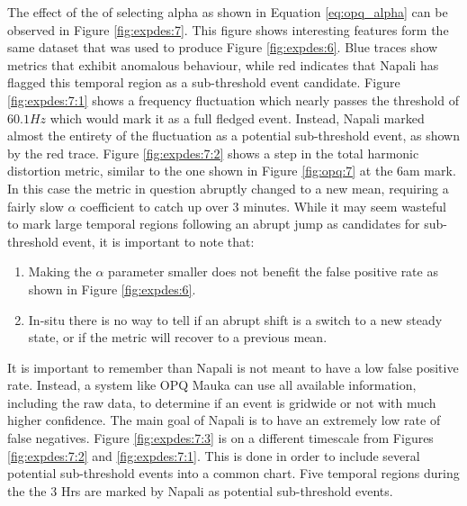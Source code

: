 The effect of the of selecting alpha as shown in Equation \ref{eq:opq_alpha} can be observed in Figure \ref{fig:expdes:7}.
This figure shows interesting features form the same dataset that was used to produce Figure \ref{fig:expdes:6}.
Blue traces show metrics that exhibit anomalous behaviour, while red indicates that Napali has flagged this temporal region as a sub-threshold event candidate.
Figure \ref{fig:expdes:7:1} shows a frequency fluctuation which nearly passes the threshold of $60.1Hz$ which would mark it as a full fledged event.
Instead, Napali marked almost the entirety of the fluctuation as a potential sub-threshold event, as shown by the red trace.
Figure \ref{fig:expdes:7:2} shows a step in the total harmonic distortion metric, similar to the one shown in Figure \ref{fig:opq:7} at the 6am mark.
In this case the metric in question abruptly changed to a new mean, requiring a fairly slow $\alpha$ coefficient to catch up over 3 minutes.
While it may seem wasteful to mark large temporal regions following an abrupt jump as candidates for sub-threshold event, it is important to note that:
\begin{enumerate}
    \item Making the $\alpha$ parameter smaller does not benefit the false positive rate as shown in Figure \ref{fig:expdes:6}.
    \item In-situ there is no way to tell if an abrupt shift is a switch to a new steady state, or if the metric will recover to a previous mean.
\end{enumerate}
It is important to remember than Napali is not meant to have a low false positive rate.
Instead, a system like OPQ Mauka can use all available information, including the raw data, to determine if an event is gridwide or not with much higher confidence.
The main goal of Napali is to have an extremely low rate of false negatives.
Figure \ref{fig:expdes:7:3} is on a different timescale from Figures \ref{fig:expdes:7:2} and \ref{fig:expdes:7:1}.
This is done in order to include several potential sub-threshold events into a common chart.
Five temporal regions during the the 3 Hrs are marked by Napali as potential sub-threshold events.
